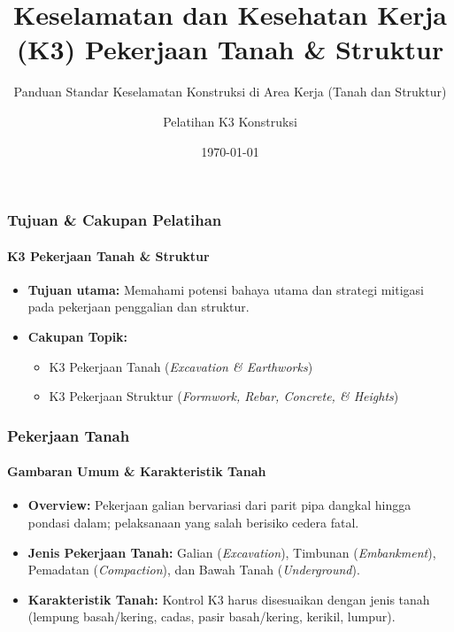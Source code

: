 \documentclass[../main.tex]{subfiles}
\title{Keselamatan dan Kesehatan Kerja (K3) Pekerjaan Tanah \& Struktur}
\subtitle{Panduan Standar Keselamatan Konstruksi di Area Kerja (Tanah dan Struktur)}
\author{Pelatihan K3 Konstruksi}
\date{\today}
\begin{document}
\begin{frame}[mytitle=center,c,mycolor=digiPH_darkblue,dark]
	\titlepage
\end{frame}

\begin{frame}[mytitle=standard,t,mycolor=digiPH_gray,light]
	\frametitle{Tujuan \& Cakupan Pelatihan}
	\framesubtitle{K3 Pekerjaan Tanah \& Struktur}
	\begin{itemize}
		\item \textbf{Tujuan utama:} Memahami potensi bahaya utama dan strategi mitigasi pada pekerjaan penggalian dan struktur.
		\item \textbf{Cakupan Topik:}
		      \begin{itemize}
			      \item K3 Pekerjaan Tanah (\textit{Excavation \& Earthworks})
			      \item K3 Pekerjaan Struktur (\textit{Formwork, Rebar, Concrete, \& Heights})
		      \end{itemize}
	\end{itemize}
\end{frame}

\begin{frame}[mytitle=center,t,mycolor=digiPH_cream,light]
	\frametitle{Pekerjaan Tanah}
	\framesubtitle{Gambaran Umum \& Karakteristik Tanah}
	\begin{itemize}
		\item \textbf{Overview:} Pekerjaan galian bervariasi dari parit pipa dangkal hingga pondasi dalam; pelaksanaan yang salah berisiko cedera fatal.
		\item \textbf{Jenis Pekerjaan Tanah:} Galian (\textit{Excavation}), Timbunan (\textit{Embankment}), Pemadatan (\textit{Compaction}), dan Bawah Tanah (\textit{Underground}).
		\item \textbf{Karakteristik Tanah:} Kontrol K3 harus disesuaikan dengan jenis tanah (lempung basah/kering, cadas, pasir basah/kering, kerikil, lumpur).
	\end{itemize}
\end{frame}
\end{document}
